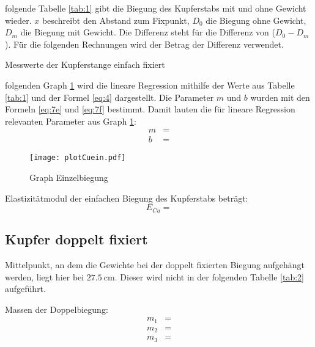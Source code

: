 \justifying folgende Tabelle \ref{tab:1} gibt die Biegung des Kupferstabs mit und ohne Gewicht wieder. $x$ beschreibt den Abstand zum Fixpunkt, $D_0$
die Biegung ohne Gewicht, $D_m$ die Biegung mit Gewicht. Die Differenz steht für die Differenz von ($D_0-D_m$). Für die folgenden Rechnungen
wird der Betrag der Differenz verwendet.
\begin{table}[H]
    \centering
    
    \caption{Messwerte der Kupferstange einfach fixiert}
    \label{tab:1}
\end{table}

\justifying folgenden Graph \ref{fig:1} wird die lineare Regression mithilfe der Werte aus Tabelle \ref{tab:1} und der Formel \eqref{eq:4} dargestellt.
Die Parameter $m$ und $b$ wurden mit den Formeln \eqref{eq:7e} und \eqref{eq:7f} bestimmt.
Damit lauten die für lineare Regression relevanten Parameter aus Graph \ref{fig:1}:
\begin{align}
    m &= \text{} \label{eq:}\\
    b &= \text{} \label{eq:}
\end{align}

\begin{figure}[H]
    \centering
    \texttt{[image: plotCuein.pdf]}
    \caption{Graph Einzelbiegung}
    \label{fig:1}
\end{figure}


\justifying Elastizitätmodul der einfachen Biegung des Kupferstabs beträgt:
\begin{equation}
E_{Cu} =  \label{eq:}
\end{equation}

\subsection{Kupfer doppelt fixiert}

\justifying Mittelpunkt, an dem die Gewichte bei der doppelt fixierten Biegung aufgehängt werden, liegt hier bei 
$\SI{27.5}{\centi\meter}$. Dieser wird nicht in der folgenden Tabelle \ref{tab:2} aufgeführt.

\justifying Massen der Doppelbiegung:
\begin{subequations}\label{eq:}
\begin{align}
    m_1 &= \text{} \label{eq:a}\\
    m_2 &= \text{} \label{eq:b}\\
    m_3 &= \text{} \label{eq:c}
\end{align}
\end{subequations}

